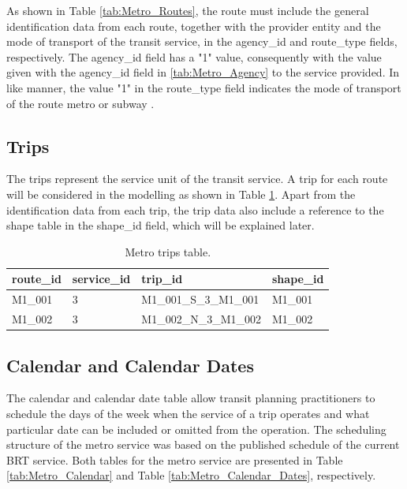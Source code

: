 \documentclass[12pt, a4paper]{report}
\begin{document}
As shown in Table \ref{tab:Metro_Routes}, the route must include the general identification data from each route, together with the provider entity and the mode of transport of the transit service, in the agency\_id and route\_type fields, respectively. The agency\_id field has a "1" value, consequently with the value given with the agency\_id field in \ref{tab:Metro_Agency} to the service provided. In like manner, the value "1" in the route\_type field indicates the mode of transport of the route metro or subway \citep{mobiltydataGeneralTransitFeed2023}. 

\subsection{Trips}

The trips represent the service unit of the transit service. A trip for each route will be considered in the modelling as shown in Table \ref{tab:Metro_Trips}. Apart from the identification data from each trip, the trip data also include a reference to the shape table in the shape\_id field, which will be explained later.


\begin{table}[ht]
\centering
\renewcommand{\arraystretch}{1.5}
\begin{tabular}{llll}
  \hline
  route\_id & service\_id & trip\_id & shape\_id \\ 
  \hline
  M1\_001 & 3 & M1\_001\_S\_3\_M1\_001 & M1\_001 \\ M1\_002 & 3 & M1\_002\_N\_3\_M1\_002 & M1\_002 \\ 
   \hline
\end{tabular}%
\caption{Metro trips table.}
\label{tab:Metro_Trips}
\end{table}

\subsection{Calendar and Calendar Dates}

The calendar and calendar date table allow transit planning practitioners to schedule the days of the week when the service of a trip operates and what particular date can be included or omitted from the operation. The scheduling structure of the metro service was based on the published schedule of the current BRT service. Both tables for the metro service are presented in Table \ref{tab:Metro_Calendar} and Table \ref{tab:Metro_Calendar_Dates}, respectively.
\end{document}
